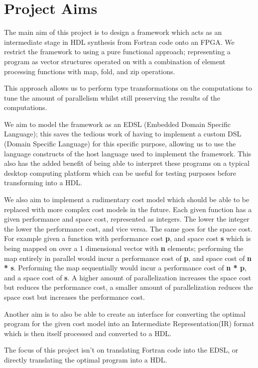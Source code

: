 \section{Project Aims}
The main aim of this project is to design a framework which acts as an intermediate stage in HDL synthesis from Fortran code onto
an FPGA. We restrict the framework to using a pure functional approach; representing a program as vector structures\cite{transformations} operated
on with a combination of element processing functions with map, fold, and zip operations.

This approach allows us to perform type transformations on the computations to tune the amount of parallelism
whilst still preserving the results of the computations. 

We aim to model the framework as an EDSL (Embedded Domain Specific Language); this saves the tedious work
of having to implement a custom DSL (Domain Specific Language) for this specific purpose, allowing us to use the 
language constructs of the host language used to implement the framework. This also has the added benefit of being able to interpret 
these programs on a typical desktop computing platform which can be useful for testing purposes before transforming into a 
HDL. 

We also aim to implement a rudimentary cost model which should be able to be replaced with more complex
cost models in the future. Each given function has a given performance and space cost, represented as integers. 
The lower the integer the lower the performance cost, and vice versa. The same goes for the space cost. 
For example given a function with performance cost \textbf{p}, and space cost \textbf{s} which is being mapped on over
a 1 dimensional vector with \textbf{n} elements; performing the map entirely in parallel would incur a performance
cost of \textbf{p}, and space cost of \textbf{n * s}. Performing the map sequentially would incur a performance cost of
\textbf{n * p}, and a space cost of \textbf{s}. A higher amount of parallelization increases the space cost but reduces
the performance cost, a smaller amount of parallelization reduces the space cost but increases the 
performance cost.

Another aim is to also be able to create an interface for converting the optimal program for the given cost model 
into an Intermediate Representation(IR) format which is then itself processed and converted to a HDL.

The focus of this project isn't on translating Fortran code into the EDSL, or directly translating the optimal program 
into a HDL.
